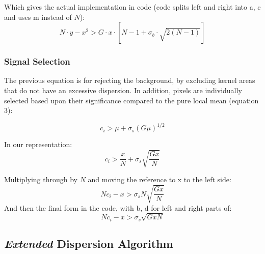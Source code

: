 \documentclass[10pt]{article}
\begin{document}
Which gives the actual implementation in code (code splits left and
right into a, c and uses m instead of $N$):
\begin{equation}
    \boxed{
        N \cdot y - x^2 > G \cdot x \cdot \left[N - 1 + \sigma_b\cdot\sqrt{2(N-1)}\right]
    }
\end{equation}
\subsubsection{Signal Selection}
The previous equation is for rejecting the background, by excluding
kernel areas that do not have an excessive dispersion. In addition,
pixels are individually selected based upon their significance compared
to the pure local mean (equation 3):

\begin{equation}
    c_i > \mu + \sigma_s\left(G\mu\right)^{1/2}
\end{equation}

In our representation:
\begin{equation}
    c_i > \frac{x}{N} + \sigma_s\sqrt{\frac{Gx}{N}}
\end{equation}

Multiplying through by $N$ and moving the reference to x to the left side:
\begin{equation}
    N c_i - x > \sigma_s N \sqrt{\frac{Gx}{N}}
\end{equation}
And then the final form in the code, with b, d for left and right parts of:
\begin{equation}
    \boxed{
        N c_i - x > \sigma_s \sqrt{G x N}
    }
\end{equation}





\subsection{\emph{Extended} Dispersion Algorithm}
\end{document}
